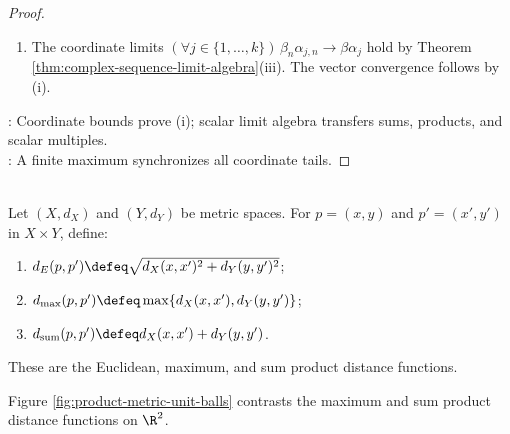\begin{theorem}
\begin{proof}
\begin{enumerate}[label=(\roman*)]
The convergence $\sum\limits_{j=1}^{k}\alpha_{j,n}\gamma_{j,n}\to\sum\limits_{j=1}^{k}\alpha_j\gamma_j$ follows by repeated application of Theorem \ref{thm:complex-sequence-limit-algebra}(i).
\item[$(iv)$] The coordinate limits $(\forall j\in\{1,\ldots,k\})\,\beta_n\alpha_{j,n}\to\beta\alpha_j$ hold by Theorem \ref{thm:complex-sequence-limit-algebra}(iii). The vector convergence follows by (i).
\end{enumerate}
: Coordinate bounds prove (i); scalar limit algebra transfers sums, products, and scalar multiples.\\
: A finite maximum synchronizes all coordinate tails.
\end{proof}
\end{theorem}

\begin{definition} \label{def:product-metrics} \\
Let $(X,d_X)$ and $(Y,d_Y)$ be metric spaces. For $p=(x,y)$ and $p'=(x',y')$ in $X\times Y$, define:
\begin{enumerate}[label=(\roman*)]
\setlength{\itemsep}{0pt}
\item $d_E(p,p')\defeq\sqrt{d_X(x,x')^2+d_Y(y,y')^2}$;
\item $d_{\max}(p,p')\defeq\max\{d_X(x,x'),d_Y(y,y')\}$;
\item $d_{\mathrm{sum}}(p,p')\defeq d_X(x,x')+d_Y(y,y')$.
\end{enumerate}
These are the Euclidean, maximum, and sum product distance functions.
\end{definition}

Figure \ref{fig:product-metric-unit-balls} contrasts the maximum and sum product distance functions on $\R^2$.
\begin{illustrationfigure}[H]
  \centering
  
  \caption{The maximum-metric unit ball is square; the sum-metric unit ball is diamond-shaped.}
  \label{fig:product-metric-unit-balls}
\end{illustrationfigure}

